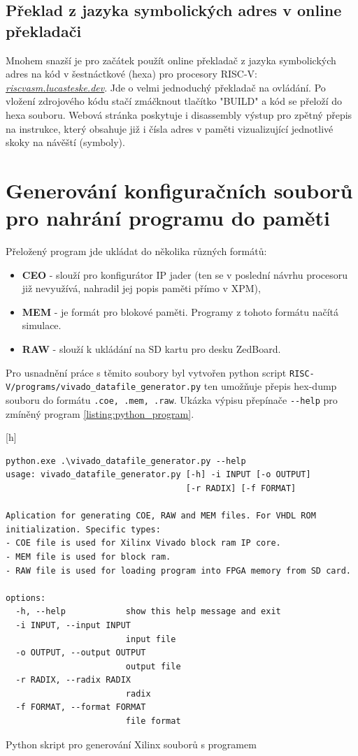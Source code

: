 \documentclass[FM,BP]{tulthesis}
\newenvironment{myquote}{\begin{list}{}{\setlength\leftmargin\parindent}\item[]}{\end{list}}
\newenvironment{listing}{\begin{myquote}\color{\tulcolor}}{\end{myquote}}
\begin{document}
\subsection{Překlad z jazyka symbolických adres v online překladači}
Mnohem snazší je pro začátek použít online překladač z jazyka symbolických adres na kód v šestnáctkové (hexa) 
 pro procesory RISC-V: 
\href{https://riscvasm.lucasteske.dev/#}{\emph{riscvasm.lucasteske.dev}}.
Jde o velmi jednoduchý překladač na ovládání. Po vložení zdrojového kódu stačí zmáčknout tlačítko "BUILD" a kód se přeloží do hexa souboru. Webová stránka poskytuje i disassembly výstup pro zpětný přepis na instrukce, který obsahuje již i čísla adres v paměti vizualizující jednotlivé skoky na návěští (symboly).

\newpage

\section{Generování konfiguračních souborů pro nahrání programu do paměti} \label{kap:generování souborů s programem}
Přeložený program jde ukládat do několika různých formátů:
\begin{itemize}
    \item \textbf{CEO} - slouží pro konfigurátor IP jader (ten se v poslední návrhu procesoru již nevyužívá, nahradil jej popis paměti přímo v XPM),
    \item \textbf{MEM} - je formát pro blokové paměti. Programy z tohoto formátu načítá simulace.
    \item \textbf{RAW} - slouží k ukládání na SD kartu pro desku ZedBoard.
\end{itemize}
Pro usnadnění práce s těmito soubory byl vytvořen python script \verb|RISC-V/programs/vivado_datafile_generator.py| ten umožňuje přepis hex-dump souboru do formátu \verb|.coe, .mem, .raw|. Ukázka výpisu přepínače \verb|--help| pro zmíněný program \ref{listing:python_program}.

\begin{listing}[h]
    \begin{verbatim}
python.exe .\vivado_datafile_generator.py --help
usage: vivado_datafile_generator.py [-h] -i INPUT [-o OUTPUT] 
                                    [-r RADIX] [-f FORMAT]    

Aplication for generating COE, RAW and MEM files. For VHDL ROM
initialization. Specific types: 
- COE file is used for Xilinx Vivado block ram IP core. 
- MEM file is used for block ram. 
- RAW file is used for loading program into FPGA memory from SD card.

options:
  -h, --help            show this help message and exit       
  -i INPUT, --input INPUT
                        input file
  -o OUTPUT, --output OUTPUT
                        output file
  -r RADIX, --radix RADIX
                        radix
  -f FORMAT, --format FORMAT
                        file format
    \end{verbatim}
    \caption{Python skript pro generování Xilinx souborů s programem}
    \label{listing:python_program}
\end{listing}
\end{document}
